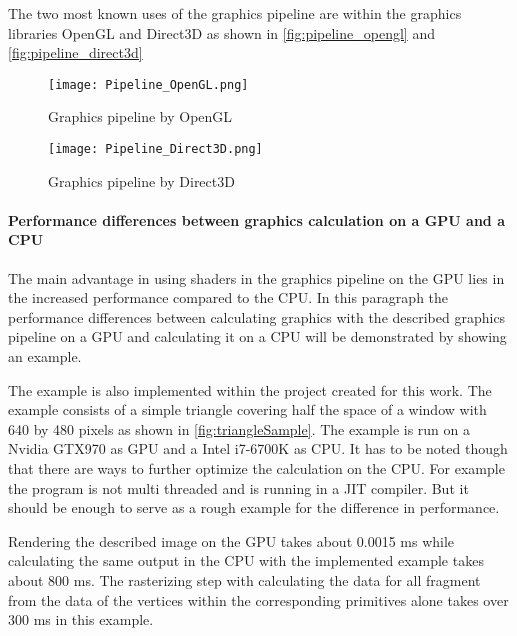 The two most known uses of the graphics pipeline are within the graphics libraries OpenGL and Direct3D as shown in  \autoref{fig:pipeline_opengl} and \autoref{fig:pipeline_direct3d}

\nocite{Khronos_pipeline.2019}
\nocite{Microsoft_pipeline.2018}

\begin{figure}[h!]
  \centering 
  \texttt{[image: Pipeline\_OpenGL.png]}
  \caption[Graphics pipeline by OpenGL ]{Graphics pipeline by OpenGL}
  \label{fig:pipeline_opengl}
\end{figure}

\begin{figure}[h!]
  \centering 
  \texttt{[image: Pipeline\_Direct3D.png]}
  \caption[Graphics pipeline by Direct3D ]{Graphics pipeline by Direct3D}
  \label{fig:pipeline_direct3d}
\end{figure}

\newpage

\paragraph{Performance differences between graphics calculation on a GPU and a CPU}

The main advantage in using shaders in the graphics pipeline on the GPU lies in the increased performance compared to the CPU.
In this paragraph the performance differences between calculating graphics with the described graphics pipeline on a GPU and calculating it on a CPU will be demonstrated by showing an example.

The example is also implemented within the project created for this work. The example consists of a simple triangle covering half the space of a window with 640 by 480 pixels as shown in \autoref{fig:triangleSample}. The example is run on a Nvidia GTX970 as GPU and a Intel i7-6700K as CPU. It has to be noted though that there are ways to further optimize the calculation on the CPU. For example the program is not multi threaded and is running in a JIT compiler. But it should be enough to serve as a rough example for the difference in performance.

Rendering the described image on the GPU takes about 0.0015 ms while calculating the same output in the CPU with the implemented example takes about 800 ms. The rasterizing step with calculating the data for all fragment from the data of the vertices within the corresponding primitives alone takes over 300 ms in this example.

